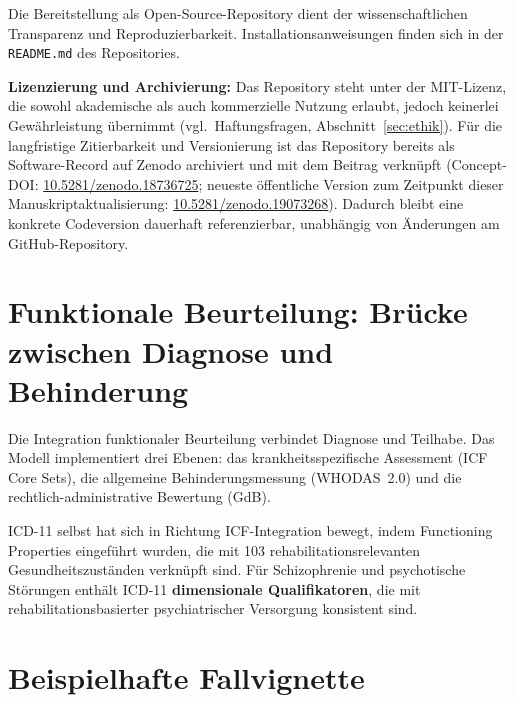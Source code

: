 \documentclass[11pt,a4paper]{article}
\begin{document}
\noindent Die Bereitstellung als Open-Source-Repository dient der wissenschaftlichen Transparenz und Reproduzierbarkeit. Installationsanweisungen finden sich in der \texttt{README.md} des Repositories.

\textbf{Lizenzierung und Archivierung:} Das Repository steht unter der MIT-Lizenz, die sowohl akademische als auch kommerzielle Nutzung erlaubt, jedoch keinerlei Gew\"ahrleistung \"ubernimmt (vgl.\ Haftungsfragen, Abschnitt~\ref{sec:ethik}). F\"ur die langfristige Zitierbarkeit und Versionierung ist das Repository bereits als Software-Record auf Zenodo archiviert und mit dem Beitrag verkn\"upft (Concept-DOI: \href{https://doi.org/10.5281/zenodo.18736725}{10.5281/zenodo.18736725}; neueste \"offentliche Version zum Zeitpunkt dieser Manuskriptaktualisierung: \href{https://doi.org/10.5281/zenodo.19073268}{10.5281/zenodo.19073268}). Dadurch bleibt eine konkrete Codeversion dauerhaft referenzierbar, unabh\"angig von \"Anderungen am GitHub-Repository.


\section{Funktionale Beurteilung: Br\"ucke zwischen Diagnose und Behinderung}
\label{sec:funktional}

Die Integration funktionaler Beurteilung verbindet Diagnose und Teilhabe. Das Modell implementiert drei Ebenen: das krankheitsspezifische Assessment (ICF Core Sets), die allgemeine Behinderungsmessung (WHODAS~2.0) und die rechtlich-administrative Bewertung (GdB).

ICD-11 selbst hat sich in Richtung ICF-Integration bewegt, indem \glqq Functioning Properties\grqq{} eingef\"uhrt wurden, die mit 103 rehabilitationsrelevanten Gesundheitszust\"anden verkn\"upft sind. F\"ur Schizophrenie und psychotische St\"orungen enth\"alt ICD-11 \textbf{dimensionale Qualifikatoren}, die mit rehabilitationsbasierter psychiatrischer Versorgung konsistent sind.


\section{Beispielhafte Fallvignette}
\label{sec:fallvignette}
\end{document}
